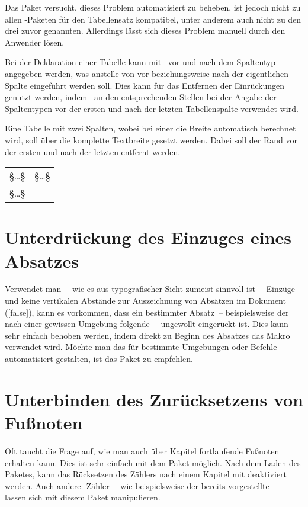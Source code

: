 Das Paket  versucht, dieses Problem automatisiert zu 
beheben, ist jedoch nicht zu allen -Paketen für den Tabellensatz 
kompatibel, unter anderem auch nicht zu den drei zuvor genannten. Allerdings 
lässt sich dieses Problem manuell durch den Anwender lösen. 

Bei der Deklaration einer Tabelle kann mit~\PParameter{\dots} vor und 
nach dem Spaltentyp angegeben werden, was anstelle von  vor 
beziehungsweise nach der eigentlichen Spalte eingeführt werden soll. Dies kann 
für das Entfernen der Einrückungen genutzt werden, indem~ an den 
entsprechenden Stellen bei der Angabe der Spaltentypen vor der ersten und nach 
der letzten Tabellenspalte verwendet wird.
%
\begin{Example}
Eine Tabelle mit zwei Spalten, wobei bei einer die Breite automatisch berechnet 
wird, soll über die komplette Textbreite gesetzt werden. Dabei soll der Rand 
vor der ersten und nach der letzten entfernt werden.
\begin{Code}[escapechar=§]
\begin{tabularx}{\textwidth}{@{}lX@{}}
§\dots§ & §\dots§ \tabularnewline
§\dots§
\end{tabularx}
\end{Code}
\end{Example}




\section{Unterdrückung des Einzuges eines Absatzes}
Verwendet man~-- wie es aus typografischer Sicht zumeist sinnvoll ist~-- 
Einzüge und keine vertikalen Abstände zur Auszeichnung von Absätzen im Dokument
([false]), kann es vorkommen, dass ein bestimmter Absatz~-- 
beispielsweise der nach einer gewissen Umgebung folgende~-- ungewollt 
eingerückt ist. Dies kann sehr einfach behoben werden, indem direkt zu Beginn 
des Absatzes das Makro  verwendet wird. Möchte man das für 
bestimmte Umgebungen oder Befehle automatisiert gestalten, ist das Paket
 zu empfehlen.



\section{Unterbinden des Zurücksetzens von Fußnoten}%
\label{sec:tips:counter}
Oft taucht die Frage auf, wie man auch über Kapitel fortlaufende Fußnoten 
erhalten kann. Dies ist sehr einfach mit dem Paket  möglich. 
Nach dem Laden des Paketes, kann das Rücksetzen des Zählers nach einem Kapitel 
mit  
deaktiviert werden. Auch andere -Zähler~-- wie beispielsweise der 
bereits vorgestellte ~-- lassen sich mit diesem 
Paket manipulieren.



